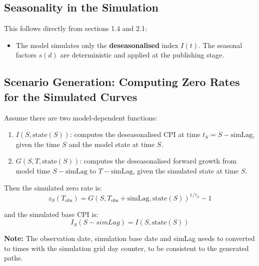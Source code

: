 \documentclass[11pt,a4paper]{article}
\begin{document}
\subsection{Seasonality in the Simulation}

This follows directly from sections 1.4 and 2.1:

\begin{itemize}
\item The model simulates only the \textbf{deseasonalised} index $I(t)$. The seasonal factors $s(d)$ are deterministic and applied at the publishing stage.
\end{itemize}

\subsection{Scenario Generation: Computing Zero Rates for the Simulated Curves}

Assume there are two model-dependent functions:
\begin{enumerate}
\item $I(S, \text{state}(S))$: computes the deseasonalised CPI at time $t_S = S - \text{simLag}$, given the time $S$ and the model state at time $S$.
\item $G(S, T, \text{state}(S))$: computes the deseasonalised forward growth from model time $S - \text{simLag}$ to $T - \text{simLag}$, given the simulated state at time $S$.
\end{enumerate}

Then the simulated zero rate is:
\begin{equation}
z_S(T_{\text{obs}}) = G(S, T_{\text{obs}} + \text{simLag}, \text{state}(S))^{1/\tau_S} - 1
\end{equation}

and the simulated base CPI is:
\begin{equation}
I_S(S - simLag) = I(S, \text{state}(S))
\end{equation}

\textbf{Note:} The observation date, simulation base date and simLag needs to converted to times with the simulation grid day counter, to be consistent to the generated paths.
\end{document}
